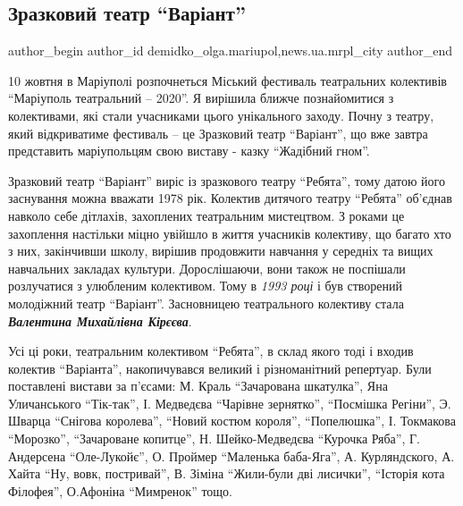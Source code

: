  
 
 
 
 
 
\subsection{Зразковий театр \enquote{Варіант}}
\label{sec:09_10_2020.stz.news.ua.mrpl_city.1.zrazkovyj_teatr_variant}
 
\ifcmt
 author_begin
   author_id demidko_olga.mariupol,news.ua.mrpl_city
 author_end
\fi


10 жовтня в Маріуполі розпочнеться Міський фестиваль театральних колективів
\enquote{Маріуполь театральний – 2020}. Я вирішила ближче познайомитися з колективами,
які стали учасниками цього унікального заходу. Почну з театру, який
відкриватиме фестиваль – це Зразковий театр \enquote{Варіант}, що вже завтра
представить маріупольцям свою виставу - казку \enquote{Жадібний гном}.

Зразковий театр \enquote{Варіант} виріс із зразкового театру \enquote{Ребята}, тому датою його
заснування можна вважати 1978 рік. Колектив дитячого театру \enquote{Ребята} об'єднав
навколо себе дітлахів, захоплених театральним мистецтвом. З роками це
захоплення настільки міцно увійшло в життя учасників колективу, що багато хто з
них, закінчивши школу, вирішив продовжити навчання у середніх та вищих
навчальних закладах культури. Дорослішаючи, вони також не поспішали розлучатися
з улюбленим колективом. Тому в \emph{1993 році} і був створений молодіжний театр
\enquote{Варіант}. Засновницею театрального колективу стала \emph{\textbf{Валентина Михайлівна
Кірєєва}}.

Усі ці роки, театральним колективом \enquote{Ребята}, в склад якого тоді і входив
колектив \enquote{Варіанта}, накопичувався великий і різноманітний репертуар. Були
поставлені вистави за п'єсами: М. Краль \enquote{Зачарована шкатулка}, Яна Уличанського
\enquote{Тік-так}, І. Медведєва \enquote{Чарівне зернятко}, \enquote{Посмішка Регіни}, Э. Шварца
\enquote{Снігова королева}, \enquote{Новий костюм короля}, \enquote{Попелюшка}, І. Токмакова \enquote{Морозко},
\enquote{Зачароване копитце}, Н. Шейко-Медведєва \enquote{Курочка Ряба}, Г. Андерсена
\enquote{Оле-Лукойє}, О. Проймер \enquote{Маленька баба-Яга}, А. Курляндского, А. Хайта \enquote{Ну, вовк,
постривай}, В. Зіміна \enquote{Жили-були дві лисички}, \enquote{Історія кота Філофея}, О.Афоніна
\enquote{Мимренок} тощо.

